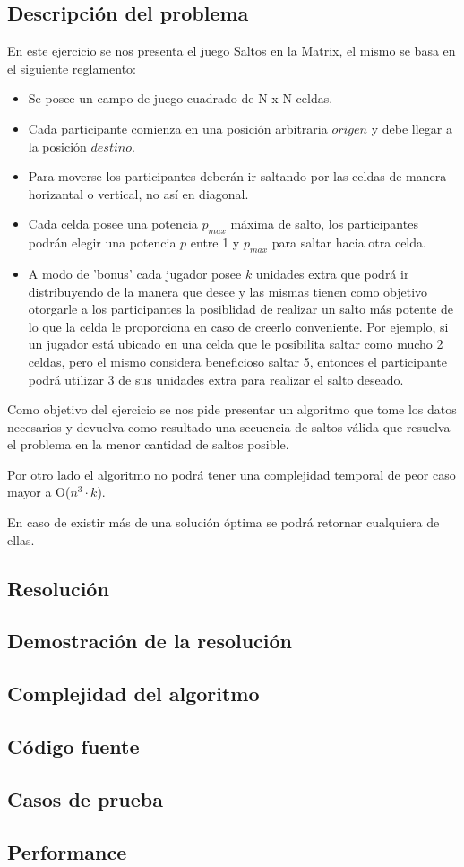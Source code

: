 \subsection{Descripci\'on del problema}

En este ejercicio se nos presenta el juego Saltos en la Matrix, el mismo se basa en el siguiente reglamento:

\begin{itemize}
\item Se posee un campo de juego cuadrado de N x N celdas.
\item Cada participante comienza en una posici\'on arbitraria $origen$ y debe llegar a la posici\'on $destino$.
\item Para moverse los participantes deber\'an ir saltando por las celdas de manera horizantal o vertical, no as\'i en diagonal.
\item Cada celda posee una potencia $p_{max}$ m\'axima de salto, los participantes podr\'an elegir una potencia $p$ entre 1 y $p_{max}$ para saltar hacia otra celda.
\item A modo de 'bonus' cada jugador posee $k$ unidades extra que podr\'a ir distribuyendo de la manera que desee y las mismas tienen como objetivo otorgarle a los participantes la posiblidad de realizar un salto m\'as potente de lo que la celda le proporciona en caso de creerlo conveniente. Por ejemplo, si un jugador est\'a ubicado en una celda que le posibilita saltar como mucho 2 celdas, pero el mismo considera beneficioso saltar 5, entonces el participante podr\'a utilizar 3 de sus unidades extra para realizar el salto deseado.
\end{itemize}

Como objetivo del ejercicio se nos pide presentar un algoritmo que tome los datos necesarios y devuelva como resultado una secuencia de saltos v\'alida que resuelva el problema en la menor cantidad de saltos posible.

Por otro lado el algoritmo no podr\'a tener una complejidad temporal de peor caso mayor a O($n^3 \cdot k$).

En caso de existir m\'as de una soluci\'on \'optima se podr\'a retornar cualquiera de ellas.


\subsection{Resoluci\'on}

\subsection{Demostraci\'on de la resoluci\'on}

\subsection{Complejidad del algoritmo}

\subsection{C\'odigo fuente}

\subsection{Casos de prueba}

\subsection{Performance}
